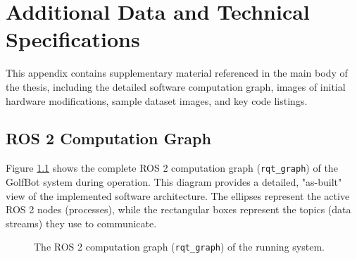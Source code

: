 \chapter{Additional Data and Technical Specifications}
\label{chap:appendix_a}

This appendix contains supplementary material referenced in the main body of the thesis, including the detailed software computation graph, images of initial hardware modifications, sample dataset images, and key code listings.

\section{ROS 2 Computation Graph}
\label{sec:appendix_rqt_graph}
Figure \ref{fig:appendix_rqt_graph} shows the complete ROS 2 computation graph (\texttt{rqt\_graph}) of the GolfBot system during operation. This diagram provides a detailed, "as-built" view of the implemented software architecture. The ellipses represent the active ROS 2 nodes (processes), while the rectangular boxes represent the topics (data streams) they use to communicate.

\begin{figure}[h!]
    \caption{The ROS 2 computation graph (\texttt{rqt\_graph}) of the running system.}
    \label{fig:appendix_rqt_graph}
\end{figure}


